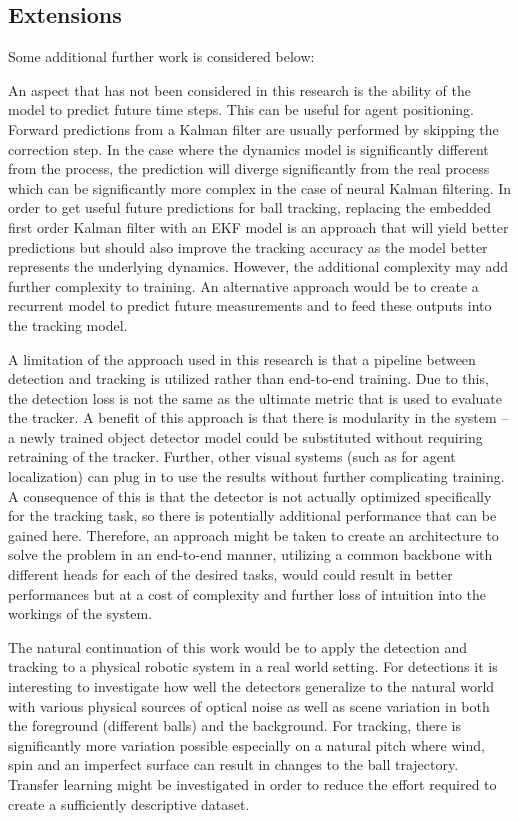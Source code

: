 \documentclass[a4paper,twoside,12pt]{report}
\begin{document}
\subsection{Extensions}

Some additional further work is considered below:

An aspect that has not been considered in this research is the ability of the model to predict future time steps. This can be useful for agent positioning. Forward predictions from a Kalman filter are usually performed by skipping the correction step. In the case where the dynamics model is significantly different from the process, the prediction will diverge significantly from the real process which can be significantly more complex in the case of neural Kalman filtering. In order to get useful future predictions for ball tracking, replacing the embedded first order Kalman filter with an EKF model is an approach that will yield better predictions but should also improve the tracking accuracy as the model better represents the underlying dynamics. However, the additional complexity may add further complexity to training. An alternative approach would be to create a recurrent model to predict future measurements and to feed these outputs into the tracking model.

A limitation of the approach used in this research is that a pipeline between detection and tracking is utilized rather than end-to-end training. Due to this, the detection loss is not the same as the ultimate metric that is used to evaluate the tracker. A benefit of this approach is that there is modularity in the system -- a newly trained object detector model could be substituted without requiring retraining of the tracker. Further, other visual systems (such as for agent localization) can plug in to use the results without further complicating training. A consequence of this is that the detector is not actually optimized specifically for the tracking task, so there is potentially additional performance that can be gained here. Therefore, an approach might be taken to create an architecture to solve the problem in an end-to-end manner, utilizing a common backbone with different heads for each of the desired tasks, would could result in better performances but at a cost of complexity and further loss of intuition into the workings of the system.

The natural continuation of this work would be to apply the detection and tracking to a physical robotic system in a real world setting. For detections it is interesting to investigate how well the detectors generalize to the natural world with various physical sources of optical noise as well as scene variation in both the foreground (different balls) and the background. For tracking, there is significantly more variation possible especially on a natural pitch where wind, spin and an imperfect surface can result in changes to the ball trajectory. Transfer learning might be investigated in order to reduce the effort required to create a sufficiently descriptive dataset.
\end{document}
